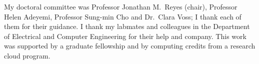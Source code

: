 My doctoral committee was Professor Jonathan M.\ Reyes (chair), Professor Helen Adeyemi,
Professor Sung-min Cho and Dr.\ Clara Voss; I thank each of them for their guidance. I thank my
labmates and colleagues in the Department of Electrical and Computer Engineering for their help
and company. This work was supported by a graduate fellowship and by computing credits from a
research cloud program.
